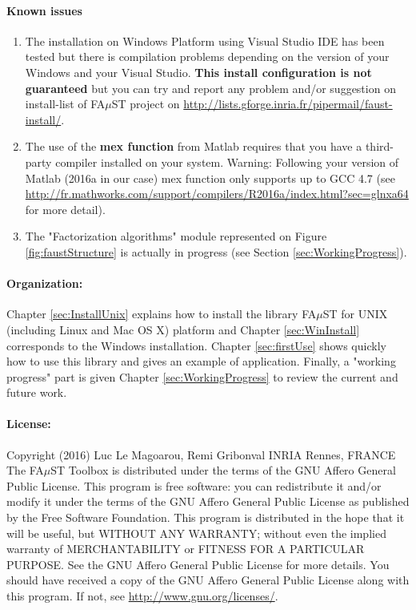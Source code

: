 \paragraph{Known issues}
\begin{enumerate}
\item The installation on Windows Platform using Visual Studio IDE has been tested but there is compilation problems depending on the version of your Windows and your Visual Studio. \textbf{This install configuration is not guaranteed} but you can try and report any problem and/or suggestion on install-list of FA$\mu$ST project on \url{http://lists.gforge.inria.fr/pipermail/faust-install/}. 
 
\item The use of the \textbf{mex function} from Matlab requires that you have a third-party compiler installed on your system. Warning: Following your version of Matlab (2016a in our case) mex function only supports up to GCC 4.7 (see \url{http://fr.mathworks.com/support/compilers/R2016a/index.html?sec=glnxa64} for more detail).

\item The "Factorization algorithms" module represented on Figure \ref{fig:faustStructure} is actually in progress (see Section \ref{sec:WorkingProgress}).

\end{enumerate}


\paragraph{Organization:}Chapter \ref{sec:InstallUnix} explains how to install the library FA$\mu$ST for UNIX (including Linux and Mac OS X) platform  and Chapter \ref{sec:WinInstall} corresponds to the Windows installation. Chapter \ref{sec:firstUse} shows quickly how to use this library and gives an example of application. Finally, a "working progress" part is given Chapter \ref{sec:WorkingProgress} to review the current and future work. 

\paragraph{License:}Copyright (2016) Luc Le Magoarou, Remi Gribonval INRIA Rennes, FRANCE \\
The FA$\mu$ST Toolbox is distributed under the terms of the GNU Affero General Public License. This program is free software: you can redistribute it and/or modify it under the terms of the GNU Affero General Public License as published by the Free Software Foundation. This program is distributed in the hope that it will be useful, but WITHOUT ANY WARRANTY; without even the implied warranty of MERCHANTABILITY or FITNESS FOR A PARTICULAR PURPOSE.  See the GNU Affero General Public License for more details. You should have received a copy of the GNU Affero General Public License along with this program.  If not, see \url{http://www.gnu.org/licenses/}.

